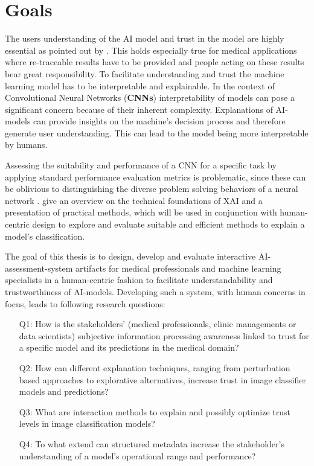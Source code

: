 \documentclass[11pt,a4paper,english]{scrreprt}
\begin{document}
\section{Goals}\label{section:goals}
The users understanding of the AI model and trust in the model are highly essential as pointed out by \textcite{knapic_explainable_2021}. This holds especially true for medical applications where re-traceable results have to be provided and people acting on these results bear great responsibility. To facilitate understanding and trust the machine learning model has to be interpretable and explainable. In the context of Convolutional Neural Networks (\textbf{CNNs}) interpretability of models can pose a significant concern because of their inherent complexity. Explanations of AI-models can provide insights on the machine's decision process and therefore generate user understanding. This can lead to the model being more interpretable by humans.

Assessing the suitability and performance of a CNN for a specific task by applying standard performance evaluation metrics is problematic, since these can be oblivious to distinguishing the diverse problem solving behaviors of a neural network \parencite{lapuschkin_unmasking_2019}. \textcite{samek_explaining_2021,JMLR:v17:15-618,ribeiro_anchors_2018} give an overview on the technical foundations of XAI and a presentation of practical methods, which will be used in conjunction with human-centric design to explore and evaluate suitable and efficient methods to explain a model's classification.

The goal of this thesis is to design, develop and evaluate interactive AI-assessment-system artifacts for medical professionals and machine learning specialists in a human-centric fashion to facilitate understandability and trustworthiness of AI-models. Developing such a system, with human concerns in focus, leads to following research questions:
\begin{itemize}
    \item[Q1:] How is the stakeholders' (medical professionals, clinic managements or data scientists) subjective information processing awareness linked to trust for a specific model and its predictions in the medical domain?
    \item[Q2:] How can different explanation techniques, ranging from perturbation based approaches to explorative alternatives, increase trust in image classifier models and predictions?
    \item[Q3:] What are interaction methods to explain and possibly optimize trust levels in image classification models?
    \item[Q4:] To what extend can structured metadata increase the stakeholder's understanding of a model's operational range and performance?
\end{itemize}
\end{document}
